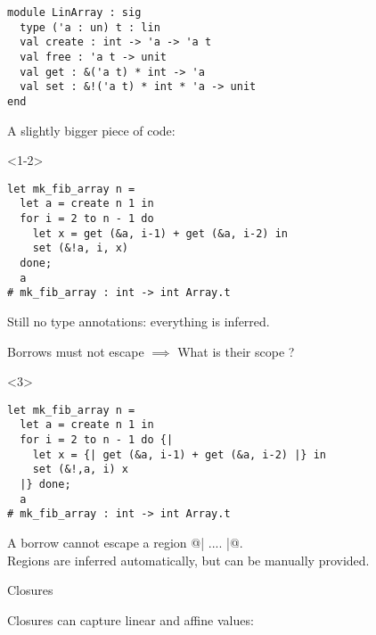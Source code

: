 \documentclass[xcolor=svgnames,11pt]{beamer}
\begin{document}
\begin{frame}[t,fragile]
\begin{lstlisting}
module LinArray : sig
  type ('a : un) t : lin
  val create : int -> 'a -> 'a t
  val free : 'a t -> unit
  val get : &('a t) * int -> 'a
  val set : &!('a t) * int * 'a -> unit
end
\end{lstlisting}

A slightly bigger piece of code:

\begin{onlyenv}<1-2>
\begin{lstlisting}
let mk_fib_array n =
  let a = create n 1 in
  for i = 2 to n - 1 do
    let x = get (&a, i-1) + get (&a, i-2) in
    set (&!a, i, x)
  done;
  a
# mk_fib_array : int -> int Array.t
\end{lstlisting}

Still no type annotations: everything is inferred.\pause

Borrows must not escape $\implies$ What is their scope ?
\end{onlyenv}
\begin{onlyenv}<3>
\begin{lstlisting}
let mk_fib_array n =
  let a = create n 1 in
  for i = 2 to n - 1 do {|
    let x = {| get (&a, i-1) + get (&a, i-2) |} in
    set (&!,a, i) x
  |} done;
  a
# mk_fib_array : int -> int Array.t
\end{lstlisting}

A borrow cannot escape a region @{| .... |}@.\\
Regions are inferred automatically, but can be manually provided.
\end{onlyenv}

\end{frame}


\begin{frame}[fragile]{Closures}

  Closures can capture linear and affine values:

\begin{lstlisting}
let a = LinArray.create 10 "foo"
let f i = LinArray.set(&!a,i,"bar")
\end{lstlisting}

If @f@ can be used multiple times, we violate the usage of @&!a@.\pause

We infer:
\begin{lstlisting}
val f : int -{aff}> unit
\end{lstlisting}

Arrows are annotated with a kind (here, \emph{Affine}) denoting their use.

@->@ is equivalent to @-{un}>@.

\end{frame}
\end{document}
